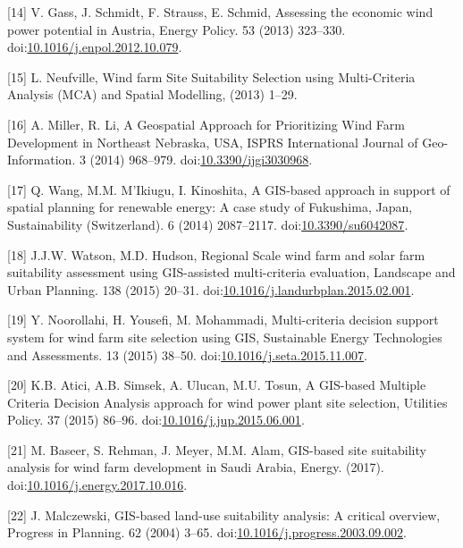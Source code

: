 \documentclass[a4paper,]{article}
\theoremstyle{definition}
\theoremstyle{definition}
\theoremstyle{definition}
\theoremstyle{remark}
\begin{document}
\hypertarget{ref-Gass2013}{}
{[}14{]} V. Gass, J. Schmidt, F. Strauss, E. Schmid, Assessing the
economic wind power potential in Austria, Energy Policy. 53 (2013)
323--330.
doi:\href{https://doi.org/10.1016/j.enpol.2012.10.079}{10.1016/j.enpol.2012.10.079}.

\hypertarget{ref-Neufville2013}{}
{[}15{]} L. Neufville, Wind farm Site Suitability Selection using
Multi-Criteria Analysis (MCA) and Spatial Modelling, (2013) 1--29.

\hypertarget{ref-Miller2014}{}
{[}16{]} A. Miller, R. Li, A Geospatial Approach for Prioritizing Wind
Farm Development in Northeast Nebraska, USA, ISPRS International Journal
of Geo-Information. 3 (2014) 968--979.
doi:\href{https://doi.org/10.3390/ijgi3030968}{10.3390/ijgi3030968}.

\hypertarget{ref-Wang2014}{}
{[}17{]} Q. Wang, M.M. M'Ikiugu, I. Kinoshita, A GIS-based approach in
support of spatial planning for renewable energy: A case study of
Fukushima, Japan, Sustainability (Switzerland). 6 (2014) 2087--2117.
doi:\href{https://doi.org/10.3390/su6042087}{10.3390/su6042087}.

\hypertarget{ref-Watson2015}{}
{[}18{]} J.J.W. Watson, M.D. Hudson, Regional Scale wind farm and solar
farm suitability assessment using GIS-assisted multi-criteria
evaluation, Landscape and Urban Planning. 138 (2015) 20--31.
doi:\href{https://doi.org/10.1016/j.landurbplan.2015.02.001}{10.1016/j.landurbplan.2015.02.001}.

\hypertarget{ref-Noorollahi2015}{}
{[}19{]} Y. Noorollahi, H. Yousefi, M. Mohammadi, Multi-criteria
decision support system for wind farm site selection using GIS,
Sustainable Energy Technologies and Assessments. 13 (2015) 38--50.
doi:\href{https://doi.org/10.1016/j.seta.2015.11.007}{10.1016/j.seta.2015.11.007}.

\hypertarget{ref-Atici2015}{}
{[}20{]} K.B. Atici, A.B. Simsek, A. Ulucan, M.U. Tosun, A GIS-based
Multiple Criteria Decision Analysis approach for wind power plant site
selection, Utilities Policy. 37 (2015) 86--96.
doi:\href{https://doi.org/10.1016/j.jup.2015.06.001}{10.1016/j.jup.2015.06.001}.

\hypertarget{ref-Baseer2017}{}
{[}21{]} M. Baseer, S. Rehman, J. Meyer, M.M. Alam, GIS-based site
suitability analysis for wind farm development in Saudi Arabia, Energy.
(2017).
doi:\href{https://doi.org/10.1016/j.energy.2017.10.016}{10.1016/j.energy.2017.10.016}.

\hypertarget{ref-Malczewski2004}{}
{[}22{]} J. Malczewski, GIS-based land-use suitability analysis: A
critical overview, Progress in Planning. 62 (2004) 3--65.
doi:\href{https://doi.org/10.1016/j.progress.2003.09.002}{10.1016/j.progress.2003.09.002}.
\end{document}
